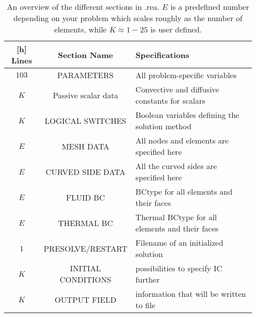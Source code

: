 \begin{table}
    \centering
    \begin{tabular}{c c l}[h]
       Lines & Section Name & Specifications \\ \hline
       $103$ & PARAMETERS & All problem-specific variables \\ 
       $K$ & Passive scalar data & Convective and diffusive constants for scalars\\ 
       $K$ & LOGICAL SWITCHES & Boolean variables defining the solution method \\ 
       $E$ & MESH DATA & All nodes and elements are specified here\\
       $E$ & CURVED SIDE DATA & All the curved sides are specified here\\
       $E$ & FLUID BC& BCtype for all elements and their faces\\
       $E$ & THERMAL BC& Thermal BCtype for all elements and their faces\\
       $1$ & PRESOLVE/RESTART & Filename of an initialized solution \\
       $K$ & INITIAL CONDITIONS & possibilities to specify IC further \\
       $K$ & OUTPUT FIELD & information that will be written to file \\
    \end{tabular}
    \caption{An overview of the different sections in .rea. $E$ is a predefined number depending on your problem
    which scales roughly as the number of elements, while $K\approx 1-25$ is user defined.}
    \label{tab:reafile}
\end{table}
%
